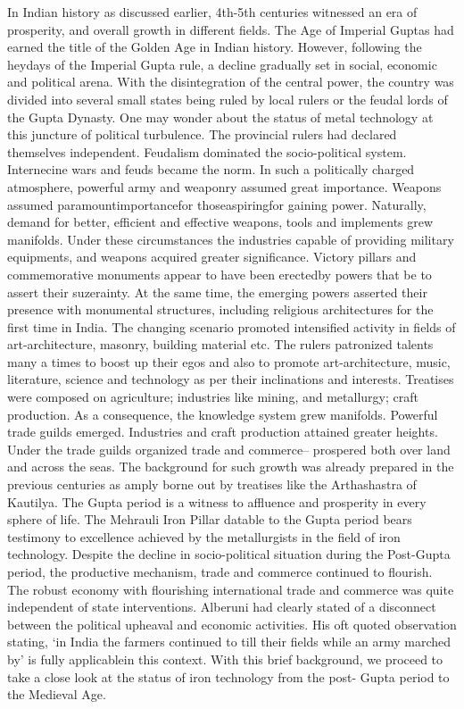 In Indian history as discussed earlier, 4th-5th centuries witnessed an era of prosperity, and overall growth in different fields. The Age of Imperial Guptas had earned the title of the Golden Age in Indian history. However, following the heydays of the Imperial Gupta rule, a decline gradually set in social, economic and political arena. With the disintegration of the central power, the country was divided into several small states being ruled by local rulers or the feudal lords of the Gupta Dynasty. One may wonder about the status of metal technology at this juncture of political turbulence. The provincial rulers had declared themselves independent. Feudalism dominated the socio-political system. Internecine wars and feuds became the norm. In such a politically charged atmosphere, powerful army and weaponry assumed great importance. Weapons assumed paramountimportancefor thoseaspiringfor gaining power. Naturally, demand for better, efficient and effective weapons, tools and implements grew manifolds. Under these circumstances the industries capable of providing military equipments, and weapons acquired greater significance. Victory pillars and commemorative monuments appear to have been erectedby powers that be to assert their suzerainty. At the same time, the emerging powers asserted their presence with monumental structures, including religious architectures for the first time in India. The changing scenario promoted intensified activity in fields of art-architecture, masonry, building material etc. The rulers patronized talents many a times to boost up their egos and also to promote art-architecture, music, literature, science and technology as per their inclinations and interests. Treatises were composed on agriculture; industries like mining, and metallurgy; craft production. As a consequence, the knowledge system grew manifolds. Powerful trade guilds emerged. Industries and craft production attained greater heights. Under the trade guilds organized trade and commerce– prospered both over land and across the seas. The background for such growth was already prepared in the previous centuries as amply borne out by treatises like the Arthashastra of Kautilya. The Gupta period is a witness to affluence and prosperity in every sphere of life. The Mehrauli Iron Pillar datable to the Gupta period bears testimony to excellence achieved by the metallurgists in the field of iron technology. Despite the decline in socio-political situation during the Post-Gupta period, the productive mechanism, trade and commerce continued to flourish. The robust economy with flourishing international trade and commerce was quite independent of state interventions. Alberuni had clearly stated of a disconnect between the political upheaval and economic activities. His oft quoted observation stating, `in India the farmers continued to till their fields while an army marched by' is fully applicablein this context. With this brief background, we proceed to take a close look at the status of iron technology from the post- Gupta period to the Medieval Age.

